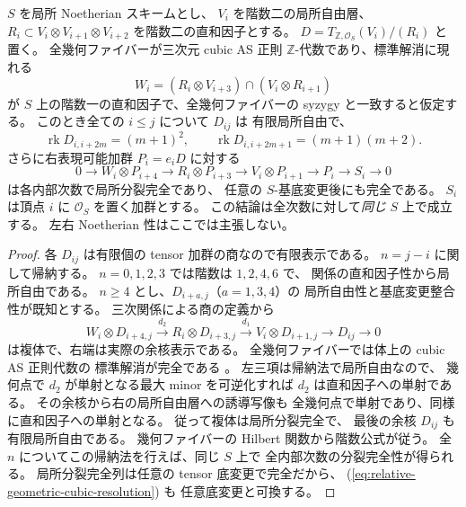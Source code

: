 \begin{lemma}
\label{lem:relative-geometric-cubic-flatness}
$S$ を局所 Noetherian スキームとし、
$V_i$ を階数二の局所自由層、
$R_i\subset V_i\otimes V_{i+1}\otimes V_{i+2}$
を階数二の直和因子とする。
$D=T_{\mathbb Z,\mathcal O_S}(V_i)/(R_i)$ と置く。
全幾何ファイバーが三次元 cubic AS 正則
$\mathbb Z$-代数であり、標準解消に現れる
\[
 W_i=(R_i\otimes V_{i+3})\cap(V_i\otimes R_{i+1})
\]
が $S$ 上の階数一の直和因子で、全幾何ファイバーの
syzygy と一致すると仮定する。
このとき全ての $i\le j$ について $D_{ij}$ は
有限局所自由で、
\[
 \operatorname{rk}D_{i,i+2m}=(m+1)^2,\qquad
 \operatorname{rk}D_{i,i+2m+1}=(m+1)(m+2).
\]
さらに右表現可能加群 $P_i=e_iD$ に対する
\[
 0\longrightarrow W_i\otimes P_{i+4}
 \longrightarrow R_i\otimes P_{i+3}
 \longrightarrow V_i\otimes P_{i+1}
 \longrightarrow P_i\longrightarrow S_i\longrightarrow0
 \tag{Geo-res}\label{eq:relative-geometric-cubic-resolution}
\]
は各内部次数で局所分裂完全であり、
任意の $S$-基底変更後にも完全である。
$S_i$ は頂点 $i$ に $\mathcal O_S$ を置く加群とする。
この結論は全次数に対して\emph{同じ} $S$ 上で成立する。
左右 Noetherian 性はここでは主張しない。
\end{lemma}
\begin{proof}
各 $D_{ij}$ は有限個の tensor 加群の商なので有限表示である。
$n=j-i$ に関して帰納する。
$n=0,1,2,3$ では階数は $1,2,4,6$ で、
関係の直和因子性から局所自由である。
$n\ge4$ とし、$D_{i+a,j}$（$a=1,3,4$）の
局所自由性と基底変更整合性が既知とする。
三次関係による商の定義から
\[
 W_i\otimes D_{i+4,j}\xrightarrow{d_2}
 R_i\otimes D_{i+3,j}\xrightarrow{d_1}
 V_i\otimes D_{i+1,j}\longrightarrow D_{ij}\longrightarrow0
 \tag{Geo-$n$}\label{eq:relative-geometric-cubic-degree}
\]
は複体で、右端は実際の余核表示である。
全幾何ファイバーでは体上の cubic AS 正則代数の
標準解消が完全である
\cite[arXiv v3, Theorem 5.5.7(1)]{VdB2011}。
左三項は帰納法で局所自由なので、
幾何点で $d_2$ が単射となる最大 minor を可逆化すれば
$d_2$ は直和因子への単射である。
その余核から右の局所自由層への誘導写像も
全幾何点で単射であり、同様に直和因子への単射となる。
従って複体は局所分裂完全で、
最後の余核 $D_{ij}$ も有限局所自由である。
幾何ファイバーの Hilbert 関数から階数公式が従う。
全 $n$ についてこの帰納法を行えば、同じ $S$ 上で
全内部次数の分裂完全性が得られる。
局所分裂完全列は任意の tensor 底変更で完全だから、
(\ref{eq:relative-geometric-cubic-resolution}) も
任意底変更と可換する。
\end{proof}

